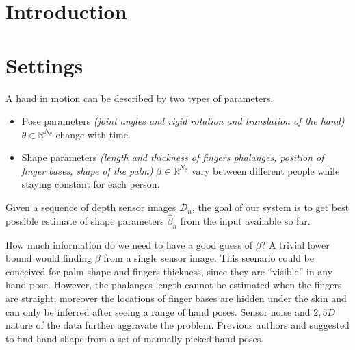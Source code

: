 \section{Introduction}
\section{Settings}
A hand in motion can be described by two types of parameters.
\begin{itemize}
\item Pose parameters \textit{(joint angles and rigid rotation and translation of the hand)} $\theta \in \mathbb{R}^{N_{\theta}}$ change with time. 
\item Shape parameters \textit{(length and thickness of fingers phalanges, position of finger bases, shape of the palm)} $\beta \in \mathbb{R}^{N_{\beta}}$ vary between different people while staying constant for each person. 
\end{itemize}
Given a sequence of depth sensor images $\mathcal{D}_n$, the goal of our system is to get best possible estimate of shape parameters $\hat{\beta}_n$ from the input available so far.

How much information do we need to have a good guess of $\beta$? A trivial lower bound would finding $\beta$ from a single sensor image. This scenario could be conceived for palm shape and fingers thickness, since they are ``visible'' in any hand pose. However, the phalanges length cannot be estimated when the fingers are straight; moreover the locations of finger bases are hidden under the skin and can only be inferred after seeing a range of hand poses. Sensor noise and $2,5 D$ nature of the data further aggravate the problem. 
Previous authors \cite{joseph2016fits} and \cite{tkach2016sphere} suggested to find hand shape from a set of manually picked hand poses. 


